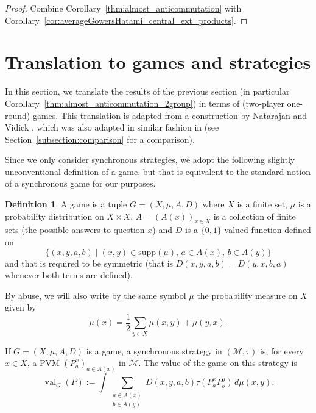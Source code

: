 \documentclass[10pt]{amsart}
\theoremstyle{plain}
\theoremstyle{definition}
\newtheorem{definition}[theorem]{Definition}
\newcommand{\cM}{\mathcal{M}}
\DeclareMathOperator{\val}{val}
\begin{document}
\begin{proof} Combine Corollary~\ref{thm:almost_anticommutation} with Corollary~\ref{cor:averageGowersHatami_central_ext_products}.
\end{proof}

\section{Translation to games and strategies}\label{section:games}
In this section, we translate the results of the previous section (in particular Corollary~\ref{thm:almost_anticommutation_2group}) in terms of (two-player one-round) games. This translation is adapted from a construction by Natarajan and Vidick \cite{MR3678246}, which was also adapted in similar fashion in \cite{MIPRE} (see Section~\ref{subsection:comparison} for a comparison).

Since we only consider synchronous strategies, we adopt the following slightly unconventional definition of a game, but that is equivalent to the standard notion of a synchronous game for our purposes.
\begin{definition}\label{def:game} A game is a tuple $G=(X,\mu,A,D)$ where $X$ is a finite set, $\mu$ is a probability distribution on $X\times X$, $A=(A(x))_{x \in X}$ is a collection of finite sets (the possible answers to question $x$) and $D$ is a $\{0,1\}$-valued function defined on
\[
\{(x,y,a,b)\mid (x,y) \in \mathrm{supp}(\mu),\, a \in A(x),\, b \in A(y)\}
\]
and that is required to be symmetric (that is $D(x,y,a,b)=D(y,x,b,a)$ whenever both terms are defined).
\end{definition}
By abuse, we will also write by the same symbol $\mu$ the probability measure on $X$ given by
\[
\mu(x) = \frac{1}{2} \sum_{y \in X} \mu(x,y)+\mu(y,x).
\]

If $G=(X,\mu,A,D)$ is a game, a synchronous strategy in $(\cM,\tau)$ is, for every $x \in X$, a PVM $(P^x_a)_{a \in A(x)}$ in $\cM$. The value of the game on this strategy is
\[
\val_G(P):=\int \sum_{\substack{a \in A(x)\\ b \in A(y)}} D(x,y,a,b) \tau(P^x_a P^y_b) \,d\mu(x,y).
\]
\end{document}
